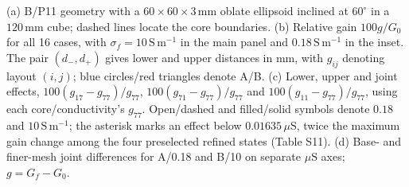 (a) B/P11 geometry with a $60\times60\times3\,\mathrm{mm}$ oblate ellipsoid inclined at $60^\circ$ in a $120\,\mathrm{mm}$ cube; dashed lines locate the core boundaries. (b) Relative gain $100g/G_0$ for all 16 cases, with $\sigma_f=10\,\mathrm{S\,m^{-1}}$ in the main panel and $0.18\,\mathrm{S\,m^{-1}}$ in the inset. The pair $(d_-,d_+)$ gives lower and upper distances in mm, with $g_{ij}$ denoting layout $(i,j)$; blue circles/red triangles denote A/B. (c) Lower, upper and joint effects, $100(g_{17}-g_{77})/g_{77}$, $100(g_{71}-g_{77})/g_{77}$ and $100(g_{11}-g_{77})/g_{77}$, using each core/conductivity's $g_{77}$. Open/dashed and filled/solid symbols denote $0.18$ and $10\,\mathrm{S\,m^{-1}}$; the asterisk marks an effect below $0.01635\,\mu\mathrm{S}$, twice the maximum gain change among the four preselected refined states (Table S11). (d) Base- and finer-mesh joint differences for A/0.18 and B/10 on separate $\mu\mathrm{S}$ axes; $g=G_f-G_0$.
